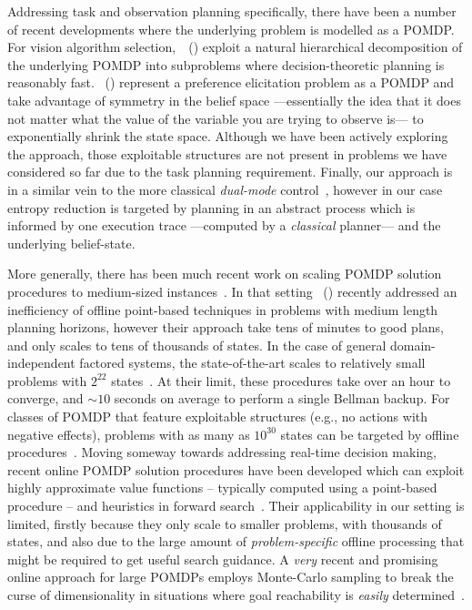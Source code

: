 






Addressing task and observation planning specifically, there have been
a number of recent developments where the underlying problem is
modelled as a POMDP.
For vision algorithm
selection,~\citeauthor{hippo-jnl}~(\citeyear{hippo-jnl}) exploit a
natural hierarchical decomposition of the underlying POMDP into
subproblems where decision-theoretic planning is reasonably
fast. \citeauthor{doshi08:pref_elic}~(\citeyear{doshi08:pref_elic})
represent a preference elicitation problem as a POMDP and take
advantage of symmetry in the belief space ---essentially the idea that
it does not matter what the value of the variable you are trying to
observe is--- to exponentially shrink the state space. Although we
have been actively exploring the \citeauthor{doshi08:pref_elic}
approach, those exploitable structures are not present in problems we
have considered so far due to the task planning requirement. 
Finally,
our approach is in a similar vein to the more classical {\em
dual-mode} control~\cite{cassandra96actingunder}, however in our case
entropy reduction is targeted by planning in an abstract process which
is informed by one execution trace ---computed by a {\em classical}
planner--- and the underlying belief-state.


More generally, there has been much recent work on scaling POMDP
solution procedures to medium-sized
instances~\cite{shani:etal:08,KurHsu08}. In that
setting \citeauthor{kurniawati:etal:2010}~(\citeyear{kurniawati:etal:2010})
recently addressed an inefficiency of offline point-based techniques
in problems with medium length planning horizons, however their
approach take tens of minutes to good plans, and only scales to tens
of thousands of states. In the case of general domain-independent
factored systems, the state-of-the-art scales to relatively small
problems with $2^{22}$ states~\cite{shani:etal:2008}. At their limit,
these procedures take over an hour to converge, and $\sim10$ seconds
on average to perform a single Bellman backup.  For classes of POMDP
that feature exploitable structures (e.g., no actions with negative
effects), problems with as many as $10^{30}$ states can be targeted by
offline procedures~\cite{brunskill:russell:2010}. Moving someway
towards addressing real-time decision making, recent online POMDP
solution procedures have been developed which can exploit highly
approximate value functions -- typically computed using a point-based
procedure -- and heuristics in forward
search~\cite{ross:etal:2008}. Their applicability in our setting is
limited, firstly because they only scale to smaller problems, with
thousands of states, and also due to the large amount of
\emph{problem-specific} offline processing that might be required to get useful
search guidance. A {\em very} recent and promising online approach for
large POMDPs employs Monte-Carlo sampling to break the curse of
dimensionality in situations where goal reachability is {\em easily}
determined~\cite{silver:veness:2010}.


